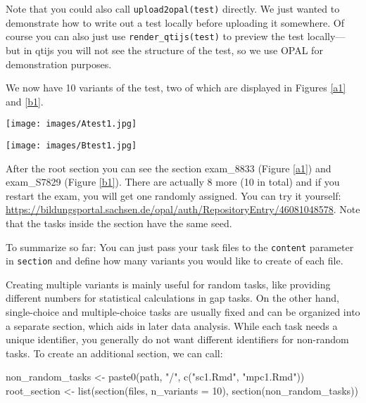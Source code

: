 \documentclass[twoside]{tufte-book}
\newenvironment{Shaded}{}{}
\newcommand{\AttributeTok}[1]{\textcolor[rgb]{0.49,0.56,0.16}{#1}}
\newcommand{\DecValTok}[1]{\textcolor[rgb]{0.25,0.63,0.44}{#1}}
\newcommand{\FunctionTok}[1]{\textcolor[rgb]{0.02,0.16,0.49}{#1}}
\newcommand{\NormalTok}[1]{#1}
\newcommand{\OtherTok}[1]{\textcolor[rgb]{0.00,0.44,0.13}{#1}}
\newcommand{\StringTok}[1]{\textcolor[rgb]{0.25,0.44,0.63}{#1}}
\begin{document}
Note that you could also call \texttt{upload2opal(test)} directly. We just wanted to demonstrate how to write out a test locally before uploading it somewhere. Of course you can also just use \texttt{render\_qtijs(test)} to preview the test locally--- but in qtijs you will not see the structure of the test, so we use OPAL for demonstration purposes.

We now have 10 variants of the test, two of which are displayed in Figures \ref{a1} and \ref{b1}.

\begin{figure*}
\centering
\texttt{[image: images/Atest1.jpg]}
\caption{\label{a1}Test structure for seed 8833.}
\end{figure*}

\begin{figure*}
\centering
\texttt{[image: images/Btest1.jpg]}
\caption{\label{b1}Test structure for seed 7829.}
\end{figure*}

After the root section you can see the section exam\_8833 (Figure \ref{a1}) and exam\_S7829 (Figure \ref{b1}). There are actually 8 more (10 in total) and if you restart the exam, you will get one randomly assigned. You can try it yourself: \url{https://bildungsportal.sachsen.de/opal/auth/RepositoryEntry/46081048578}. Note that the tasks inside the section have the same seed.

To summarize so far: You can just pass your task files to the \texttt{content} parameter in \texttt{section} and define how many variants you would like to create of each file.

Creating multiple variants is mainly useful for random tasks, like providing different numbers for statistical calculations in gap tasks. On the other hand, single-choice and multiple-choice tasks are usually fixed and can be organized into a separate section, which aids in later data analysis. While each task needs a unique identifier, you generally do not want different identifiers for non-random tasks. To create an additional section, we can call:

\begin{Shaded}
\begin{Highlighting}[]
\NormalTok{non\_random\_tasks }\OtherTok{\textless{}{-}} \FunctionTok{paste0}\NormalTok{(path, }\StringTok{"/"}\NormalTok{, }\FunctionTok{c}\NormalTok{(}\StringTok{"sc1.Rmd"}\NormalTok{, }\StringTok{"mpc1.Rmd"}\NormalTok{))}
\NormalTok{root\_section }\OtherTok{\textless{}{-}} \FunctionTok{list}\NormalTok{(}\FunctionTok{section}\NormalTok{(files, }\AttributeTok{n\_variants =} \DecValTok{10}\NormalTok{),}
                     \FunctionTok{section}\NormalTok{(non\_random\_tasks))}
\end{Highlighting}
\end{Shaded}
\end{document}
